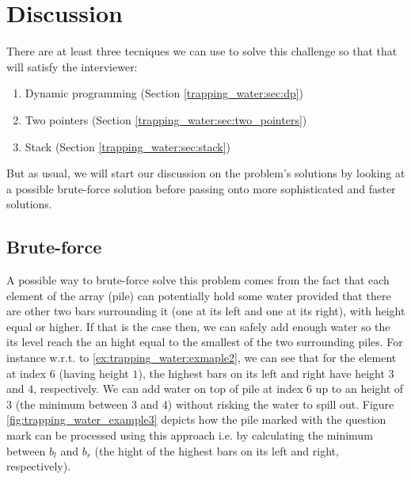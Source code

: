 %
%	

\section{Discussion}
\label{trapping_water:sec:discussion}
There are at least three tecniques we can use to  solve this challenge so that that will satisfy the interviewer:
\begin{enumerate}
	\item Dynamic programming (Section \ref{trapping_water:sec:dp})
	\item Two pointers (Section \ref{trapping_water:sec:two_pointers})
	\item Stack (Section \ref{trapping_water:sec:stack})
\end{enumerate}
But as usual, we will start our discussion on the problem's solutions by looking at a possible brute-force solution before  passing onto more sophisticated and faster solutions.

\subsection{Brute-force}
\label{trapping_water:sec:bruteforce}

A possible way to brute-force  solve this problem comes from the fact that each element of the array (pile) can potentially hold some water provided that there are other two bars surrounding it (one at its left and one at its right), with height equal or higher.
If that is the case then, we can safely add enough water so the its level reach the an hight equal to the smallest of the two surrounding piles.
For instance w.r.t. to \ref{ex:trapping_water:exmaple2}, we can see that for the element at index $6$ (having height $1$), the highest bars on its left and right have height $3$ and $4$, respectively. 
We can add water on top of pile at index $6$ up to an height of $3$ (the minimum between $3$ and $4$) without risking the water to spill out.
Figure \ref{fig:trapping_water_example3} depicts how the pile marked with the question mark can be processed using this approach i.e. by calculating the minimum between $b_l$ and $b_r$ (the hight of the highest bars on its left and right, respectively).

